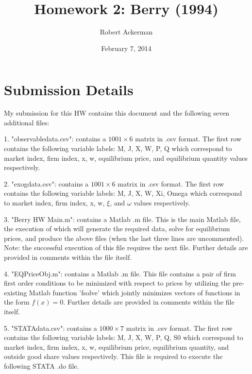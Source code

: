 \documentclass[11pt]{article}
\title{Homework 2: Berry (1994)}
\author{Robert Ackerman}
\date{February 7, 2014}							%
\theoremstyle{definition}
\begin{document}
\maketitle
\section*{Submission Details}
\indent 
\par
My submission for this HW contains this document and the following seven additional files:

\vspace{2mm}
1. "observable\textunderscore data.csv": contains a $1001 \times 6$ matrix in .csv format.  The first row contains the following variable labels: M, J, X, W, P, Q which correspond to market index, firm index, x, w, equilibrium price, and equilibrium quantity  values respectively.   

\vspace{2mm}
2. "exog\textunderscore data.csv": contains a $1001 \times 6$ matrix in .csv format.  The first row contains the following variable labels: M, J, X, W, Xi, Omega which correspond to market index, firm index, x, w, $\xi$, and $\omega$ values respectively.   

\vspace{2mm}
3. "Berry HW Main.m": contains a Matlab .m file.  This is the main Matlab file, the execution of which will generate the required data, solve for equilibrium prices, and produce the above files (when the last three lines are uncommented).  Note: the successful execution of this file requires the next file. Further details are provided in comments within the file itself.

\vspace{2mm}
4. "EQPriceObj.m": contains a Matlab .m file.  This file contains a pair of firm first order conditions to be minimized with respect to prices by utilizing the pre-existing Matlab function 'fsolve' which jointly minimizes vectors of functions in the form $f(x)=0$. Further details are provided in comments within the file itself.

\vspace{2mm}
5. "STATA\textunderscore data.csv": contains a $1000 \times 7$ matrix in .csv format.  The first row contains the following variable labels: M, J, X, W, P, Q, S0 which correspond to market index, firm index, x, w, equilibrium price, equilibrium quantity, and outside good share values respectively.   This file is required to execute the following  STATA .do file.
\end{document}
